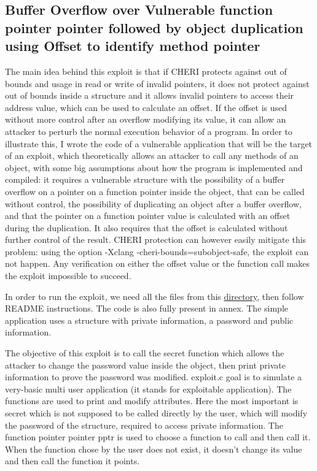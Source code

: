 \documentclass[a4paper, 11pt]{article}
\begin{document}
\subsection{Buffer Overflow over Vulnerable function pointer pointer followed by object duplication using Offset to identify method pointer}

The main idea behind this exploit is that if CHERI protects against out of bounds and usage in read or write of invalid pointers, it does not protect against out of bounds inside a structure and it allows invalid pointers to access their address value, which can be used to calculate an offset. If the offset is used without more control after an overflow modifying its value, it can allow an attacker to perturb the normal execution behavior of a program.
In order to illustrate this, I wrote the code of a vulnerable application that will be the target of an exploit, which theoretically allows an attacker to call any methods of an object, with some big assumptions about how the program is implemented and compiled: it requires a vulnerable structure with the possibility of a buffer overflow on a pointer on a function pointer inside the object, that can be called without control, the possibility of duplicating an object after a buffer overflow, and that the pointer on a function pointer value is calculated with an offset during the duplication. It also requires that the offset is calculated without further control of the result. 
CHERI protection can however easily mitigate this problem: using the option -Xclang -cheri-bounds=subobject-safe, the exploit can not happen. Any verification on either the offset value or the function call makes the exploit impossible to succeed.

In order to run the exploit, we need all the files from this \href{https://github.com/pglbgit2/exploit.git}{directory}, then follow README instructions. The code is also fully present in annex.
The simple application uses a structure with private information, a password and public information.


The objective of this exploit is to call the secret function which allows the attacker to change the password value inside the object, then print private information to prove the password was modified.
exploit.c goal is to simulate a very-basic multi user application (it stands for exploitable application). 
The functions are used to print and modify attributes. Here the most important is secret which is not supposed to be called directly by the user, which will modify the password of the structure, required to access private information. The function pointer pointer pptr is used to choose a function to call and then call it. When the function chose by the user does not exist, it doesn't change its value and then call the function it points.
\end{document}
